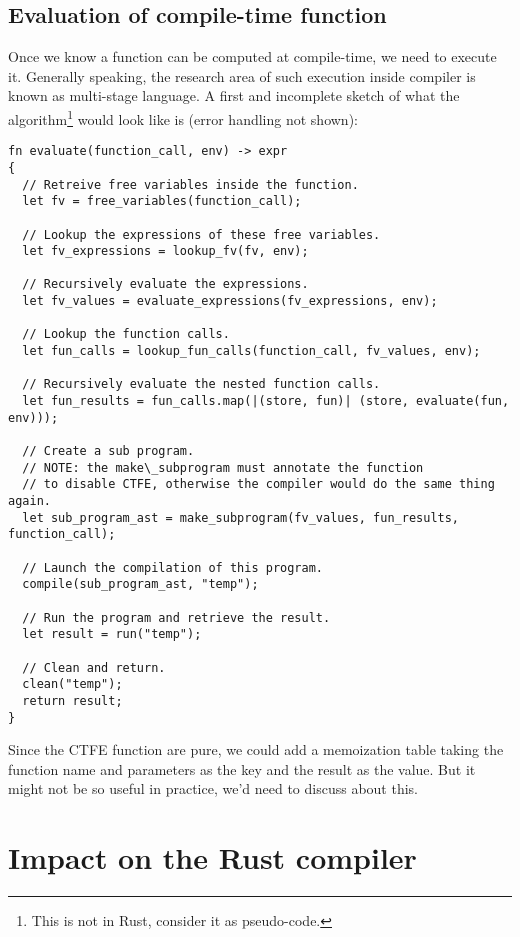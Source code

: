 \documentclass[a4paper,11pt]{article}
\begin{document}
\subsection{Evaluation of compile-time function}
\label{ctfe-evaluation}

Once we know a function can be computed at compile-time, we need to execute it. Generally speaking, the research area of such execution inside compiler is known as multi-stage language\cite{DBLP:conf/gpce/CalcagnoTHL03,DBLP:conf/dagstuhl/Taha03}. A first and incomplete sketch of what the algorithm\footnote{This is not in Rust, consider it as pseudo-code.} would look like is (error handling not shown):

\begin{lstlisting}
fn evaluate(function_call, env) -> expr
{
  // Retreive free variables inside the function.
  let fv = free_variables(function_call);

  // Lookup the expressions of these free variables.
  let fv_expressions = lookup_fv(fv, env);

  // Recursively evaluate the expressions.
  let fv_values = evaluate_expressions(fv_expressions, env);

  // Lookup the function calls.
  let fun_calls = lookup_fun_calls(function_call, fv_values, env);

  // Recursively evaluate the nested function calls.
  let fun_results = fun_calls.map(|(store, fun)| (store, evaluate(fun, env)));

  // Create a sub program.
  // NOTE: the make\_subprogram must annotate the function
  // to disable CTFE, otherwise the compiler would do the same thing again.
  let sub_program_ast = make_subprogram(fv_values, fun_results, function_call);

  // Launch the compilation of this program.
  compile(sub_program_ast, "temp");

  // Run the program and retrieve the result.
  let result = run("temp");

  // Clean and return.
  clean("temp");
  return result;
}
\end{lstlisting}

Since the CTFE function are pure, we could add a memoization table taking the function name and parameters as the key and the result as the value. But it might not be so useful in practice, we'd need to discuss about this.

\section{Impact on the Rust compiler}
\label{impact-rust-compiler}
\end{document}
